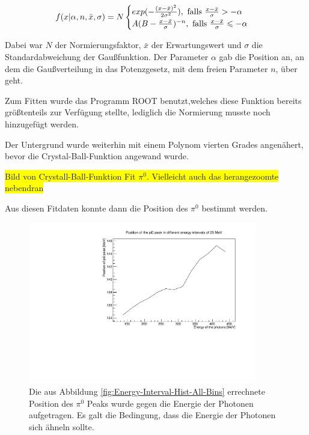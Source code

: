 \documentclass[a4paper,11pt,oneside,final,german,openbib,pdftex]{scrbook}
\begin{document}
{\begin{equation}
	f(x|\alpha,n,\bar{x},\sigma)=N\begin{cases}exp(-\frac{(x-\bar{x})^2}{2\sigma^2}), \textnormal{  falls $\frac{x-\bar{x}}{\sigma}> -\alpha$} \\
	A(B-\frac{x-\bar{x}}{\sigma})^{-n}, \textnormal{  falls $\frac{x-\bar{x}}{\sigma}\leqslant -\alpha$} 
	\end{cases}
	\label{eq:Crystal-Ball-Funktion}
\end{equation}

Dabei war $N$ der Normierungsfaktor, $\bar{x}$ der Erwartungswert und $\sigma$ die Standardabweichung der Gau{\ss}funktion. Der Parameter $\alpha$ gab die Position an, an dem die Gau{\ss}verteilung in das Potenzgesetz, mit dem freien Parameter $n$, \"uber geht\cite{NBI15}. 

Zum Fitten wurde das Programm ROOT benutzt,welches diese Funktion bereits gr\"o{\ss}tenteils zur Verf\"ugung stellte, lediglich die Normierung musste noch hinzugef\"ugt werden.

Der Untergrund wurde weiterhin mit einem Polynom vierten Grades angen\"ahert, bevor die Crystal-Ball-Funktion angewand wurde.

\colorbox{yellow}{Bild von Crystall-Ball-Funktion Fit $\pi^0$. Vielleicht auch das herangezoomte nebendran}

 Aus diesen Fitdaten konnte dann die Position des $\pi^0$ bestimmt werden. 
 
 \begin{figure}[h!]
 	\begin{center}
 		\includegraphics[width=100mm]{RealDataEnergyIntervalSymmetricPhotonsDeviation}
 	
 		\caption{Die aus Abbildung \ref{fig:Energy-Interval-Hist-All-Bins} errechnete Position des $\pi^0$ Peaks wurde gegen die Energie der Photonen aufgetragen.
 			Es galt die Bedingung, dass die Energie der Photonen sich \"ahneln sollte.
 		} 
 		\label{fig.Energydependency_pion}
 	\end{center}
 \end{figure}

}
\end{document}
